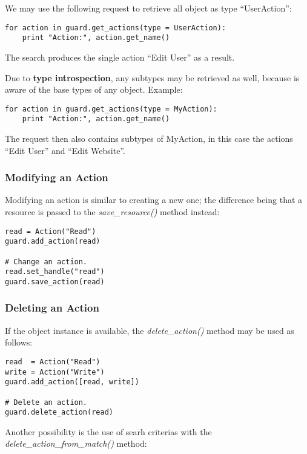 \begin{enumerate}
We may use the following request to retrieve all object as type 
``UserAction'':

\begin{lstlisting}
for action in guard.get_actions(type = UserAction):
    print "Action:", action.get_name()
\end{lstlisting}

The search produces the single action ``Edit User'' as a result.

Due to {\bf type introspection}, any subtypes may be retrieved as 
well, because \product is aware of the base types of any object.
Example:

\begin{lstlisting}
for action in guard.get_actions(type = MyAction):
    print "Action:", action.get_name()
\end{lstlisting}

The request then also contains subtypes of MyAction, in this case the actions 
``Edit User'' and ``Edit Website''.
\end{enumerate}


\subsubsection{Modifying an Action}

Modifying an action is similar to creating a new one; the difference being 
that a resource is passed to the {\it save\_resource()} method instead:

\begin{lstlisting}
read = Action("Read")
guard.add_action(read)

# Change an action.
read.set_handle("read")
guard.save_action(read)
\end{lstlisting}


\subsubsection{Deleting an Action}

If the object instance is available, the {\it delete\_action()} method may 
be used as follows:

\begin{lstlisting}
read  = Action("Read")
write = Action("Write")
guard.add_action([read, write])

# Delete an action.
guard.delete_action(read)
\end{lstlisting}

Another possibility is the use of searh criterias with the 
{\it delete\_action\_from\_match()} method:


